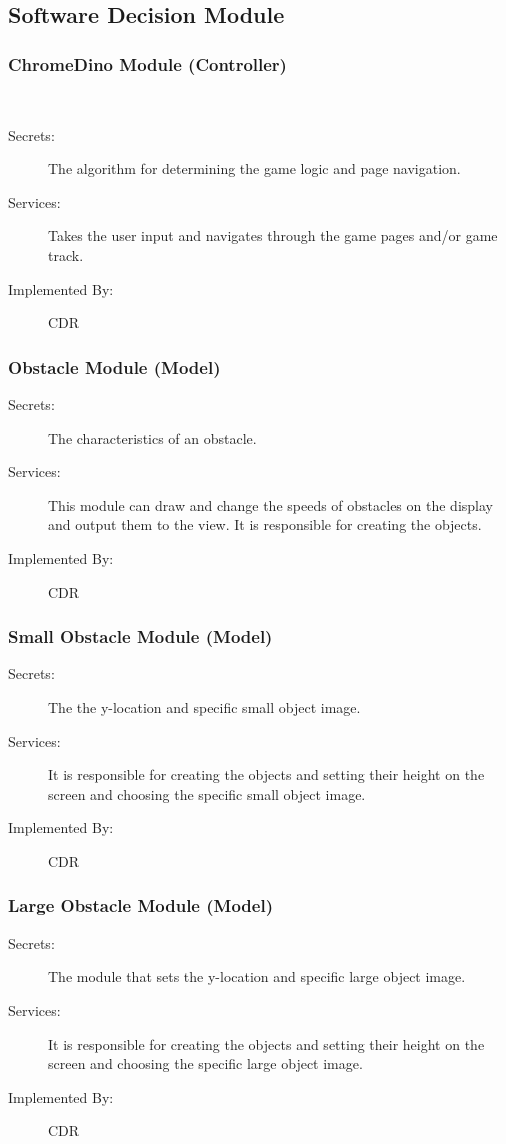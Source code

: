 \documentclass[12pt, titlepage]{article}
\begin{document}
\subsection{Software Decision Module}

\subsubsection{ChromeDino Module (Controller)}\\
\begin{description}
\item[Secrets:] The algorithm for determining the game logic and page navigation. 
\item[Services:] Takes the user input and navigates through the game pages and/or game track.  
\item[Implemented By:] CDR
\end{description}


\subsubsection{Obstacle Module (Model)}
\begin{description}
\item[Secrets:] The characteristics of an obstacle.
\item[Services:] This module can draw and change the speeds of obstacles on the display and output them to the view. It is responsible for creating the objects.
\item[Implemented By:] CDR
\end{description}


\subsubsection{Small Obstacle Module (Model)}
\begin{description}
\item[Secrets:] The the y-location and specific small object image. 
\item[Services:] It is responsible for creating the objects and setting their height on the screen and choosing the specific small object image.
\item[Implemented By:] CDR
\end{description}


\subsubsection{Large Obstacle Module (Model)}
\begin{description}
\item[Secrets:] The module that sets the y-location and specific large object image. 
\item[Services:] It is responsible for creating the objects and setting their height on the screen and choosing the specific large object image. 
\item[Implemented By:] CDR
\end{description}
\end{document}
